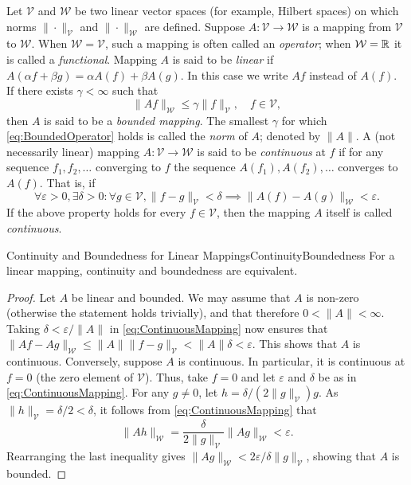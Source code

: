Let \(\mathcal{V}\) and \(\mathcal{W}\) be two linear vector spaces (for example, Hilbert spaces) on which norms \(\|\cdot\|_{\mathcal{V}}\) and \(\|\cdot\|_{\mathcal{W}}\) are defined. Suppose \(A : \mathcal{V} \to \mathcal{W}\) is a mapping from \(\mathcal{V}\) to \(\mathcal{W}\). When \(\mathcal{W} = \mathcal{V}\), such a mapping is often called an \textit{operator}; when \(\mathcal{W} = \mathbb{R}\) it is called a \textit{functional}. Mapping \(A\) is said to be \textit{linear} if \(A(\alpha f + \beta g) = \alpha A(f) + \beta A(g)\). In this case we write \(Af\) instead of \(A(f)\). If there exists \(\gamma < \infty\) such that
\begin{equation}
	\|Af\|_{\mathcal{W}} \le \gamma \|f\|_{\mathcal{V}}, \quad f \in \mathcal{V}, \label{eq:BoundedOperator}
\end{equation}
then \(A\) is said to be a \textit{bounded mapping}. The smallest \(\gamma\) for which \eqref{eq:BoundedOperator} holds is called the \textit{norm} of \(A\); denoted by \(\|A\|\). A (not necessarily linear) mapping \(A : \mathcal{V} \to \mathcal{W}\) is said to be \textit{continuous} at \(f\) if for any sequence \(f_1, f_2, \dots\) converging to \(f\) the sequence \(A(f_1), A(f_2), \dots\) converges to \(A(f)\). That is, if
\begin{equation}
	\forall \varepsilon > 0, \exists \delta > 0 : \forall g \in \mathcal{V}, \|f - g\|_{\mathcal{V}} < \delta \implies \|A(f) - A(g)\|_{\mathcal{W}} < \varepsilon. \label{eq:ContinuousMapping}
\end{equation}
If the above property holds for every \(f \in \mathcal{V}\), then the mapping \(A\) itself is called \textit{continuous}.

\begin{thm}{Continuity and Boundedness for Linear Mappings}{ContinuityBoundedness}
	For a linear mapping, continuity and boundedness are equivalent.
\end{thm}

\begin{proof}
	Let \(A\) be linear and bounded. We may assume that \(A\) is non-zero (otherwise the statement holds trivially), and that therefore \(0 < \|A\| < \infty\). Taking \(\delta < \varepsilon / \|A\|\) in \eqref{eq:ContinuousMapping} now ensures that \(\|Af - Ag\|_{\mathcal{W}} \le \|A\| \|f - g\|_{\mathcal{V}} < \|A\| \delta < \varepsilon\). This shows that \(A\) is continuous.
	Conversely, suppose \(A\) is continuous. In particular, it is continuous at \(f = 0\) (the zero element of \(\mathcal{V}\)). Thus, take \(f = 0\) and let \(\varepsilon\) and \(\delta\) be as in \eqref{eq:ContinuousMapping}. For any \(g \neq 0\), let \(h = \delta / (2\|g\|_{\mathcal{V}}) g\). As \(\|h\|_{\mathcal{V}} = \delta/2 < \delta\), it follows from \eqref{eq:ContinuousMapping} that
	\begin{equation*}
		\|Ah\|_{\mathcal{W}} = \frac{\delta}{2\|g\|_{\mathcal{V}}} \|Ag\|_{\mathcal{W}} < \varepsilon.
	\end{equation*}
	Rearranging the last inequality gives \(\|Ag\|_{\mathcal{W}} < 2\varepsilon / \delta \|g\|_{\mathcal{V}}\), showing that \(A\) is bounded.
\end{proof}

